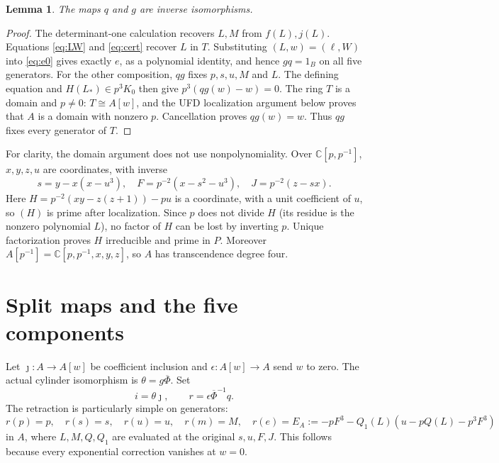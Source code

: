\documentclass[11pt]{article}
\newtheorem{lemma}[theorem]{Lemma}
\newcommand{\C}{\mathbb C}
\begin{document}
\begin{lemma}\label{lem:inverse}
The maps $q$ and $g$ are inverse isomorphisms.
\end{lemma}
\begin{proof}
The determinant-one calculation recovers $L,M$ from $f(L),j(L)$.
Equations \eqref{eq:LW} and \eqref{eq:cert} recover $L$ in $T$.
Substituting $(L,w)=(\ell,W)$ into \eqref{eq:e0} gives exactly $e$,
as a polynomial identity, and hence $gq=1_B$ on all five generators.
For the other composition, $qg$ fixes $p,s,u,M$ and $L$.
The defining equation and $H(L_*)\in p^3K_0$ then give
$p^3(qg(w)-w)=0$. The ring $T$ is a domain and $p\ne0$:
$T\cong A[w]$, and the UFD localization argument below proves that $A$
is a domain with nonzero $p$. Cancellation proves $qg(w)=w$.
Thus $qg$ fixes every generator of $T$.
\end{proof}

For clarity, the domain argument does not use nonpolynomiality.
Over $\C[p,p^{-1}]$, $x,y,z,u$ are coordinates, with inverse
\[
s=y-x(x-u^3),\quad F=p^{-2}(x-s^2-u^3),\quad J=p^{-2}(z-sx).
\]
Here $H=p^{-2}(xy-z(z+1))-pu$ is a coordinate, with a unit coefficient
of $u$, so $(H)$ is prime after localization. Since $p$ does not divide
$H$ (its residue is the nonzero polynomial $L$), no factor of $H$ can
be lost by inverting $p$. Unique factorization proves $H$ irreducible
and prime in $P$. Moreover $A[p^{-1}]=\C[p,p^{-1},x,y,z]$,
so $A$ has transcendence degree four.

\section{Split maps and the five components}\label{sec:idempotent}
Let $\jmath:A\to A[w]$ be coefficient inclusion and
$\epsilon:A[w]\to A$ send $w$ to zero. The actual cylinder isomorphism
is $\theta=g\overline\Phi$. Set
\begin{equation}\label{eq:split}
i=\theta\jmath,\qquad r=\epsilon\overline\Phi^{-1}q.
\end{equation}
The retraction is particularly simple on generators:
\begin{equation}\label{eq:r}
r(p)=p,\quad r(s)=s,\quad r(u)=u,\quad r(m)=M,\quad
r(e)=E_A:=-pF^3-Q_1(L)(u-pQ(L)-p^3F^3)
\end{equation}
in $A$, where $L,M,Q,Q_1$ are evaluated at the original $s,u,F,J$.
This follows because every exponential correction vanishes at $w=0$.
\end{document}
